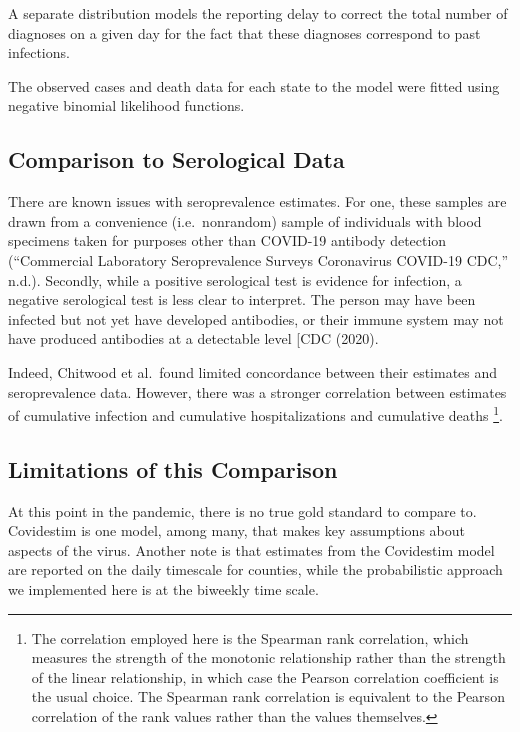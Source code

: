 \documentclass[12pt,twoside]{smiththesis}
\begin{document}
A separate distribution models the reporting delay to correct the total number of diagnoses on a given day for the fact that these diagnoses correspond to past infections.

The observed cases and death data for each state to the model were fitted using negative binomial likelihood functions.

\hypertarget{comparison-to-serological-data}{%
\subsection{Comparison to Serological Data}\label{comparison-to-serological-data}}

There are known issues with seroprevalence estimates. For one, these samples are drawn from a convenience (i.e.~nonrandom) sample of individuals with blood specimens taken for purposes other than COVID-19 antibody detection ({``Commercial {Laboratory Seroprevalence Surveys} \textbar{} {Coronavirus} \textbar{} {COVID-19} \textbar{} {CDC},''} n.d.). Secondly, while a positive serological test is evidence for infection, a negative serological test is less clear to interpret. The person may have been infected but not yet have developed antibodies, or their immune system may not have produced antibodies at a detectable level {[}CDC (2020).

Indeed, Chitwood et al.~found limited concordance between their estimates and seroprevalence data. However, there was a stronger correlation between estimates of cumulative infection and cumulative hospitalizations and cumulative deaths \footnote{The correlation employed here is the Spearman rank correlation, which measures the strength of the monotonic relationship rather than the strength of the linear relationship, in which case the Pearson correlation coefficient is the usual choice. The Spearman rank correlation is equivalent to the Pearson correlation of the rank values rather than the values themselves. }.

\hypertarget{lims}{%
\subsection{Limitations of this Comparison}\label{lims}}

At this point in the pandemic, there is no true gold standard to compare to. Covidestim is one model, among many, that makes key assumptions about aspects of the virus. Another note is that estimates from the Covidestim model are reported on the daily timescale for counties, while the probabilistic approach we implemented here is at the biweekly time scale.
\end{document}
